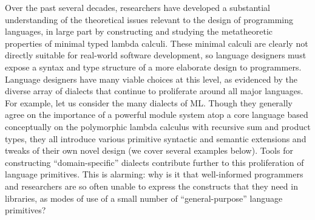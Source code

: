 Over the past several decades, researchers have developed a substantial understanding of  the theoretical issues relevant to the design of programming languages, in large part by constructing and studying the metatheoretic properties of minimal typed lambda calculi. These minimal calculi are clearly not directly suitable for real-world software development, so language designers must expose a syntax and type structure of a more elaborate design to programmers. %
Language designers have many viable choices at this level, as evidenced by the diverse array of dialects that continue to proliferate around all major languages. For example, let us consider the many dialects of ML. Though they generally agree on the importance of a powerful module system atop a core language based conceptually on the   polymorphic lambda calculus with recursive sum and product types, they all introduce various primitive syntactic and semantic extensions and tweaks of their own novel design (we cover several examples below). 
Tools for  constructing ``domain-specific'' dialects contribute further to this proliferation of language primitives. This is alarming: why is it that well-informed programmers and researchers are so often unable to express the constructs that they need in libraries, as modes of use of a small number of ``general-purpose'' language primitives?

